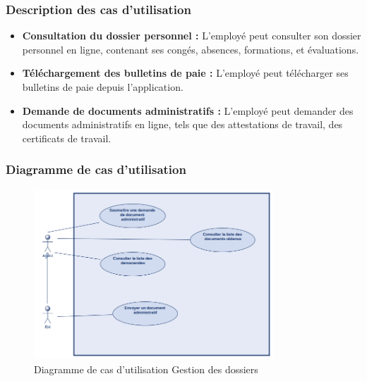 \subsubsection{Description des cas d'utilisation}
\begin{itemize}
    \item \textbf{Consultation du dossier personnel :} L'employé peut consulter son dossier personnel en ligne, contenant ses congés, absences, formations, et évaluations.
    \item \textbf{Téléchargement des bulletins de paie :} L'employé peut télécharger ses bulletins de paie depuis l'application.
    \item \textbf{Demande de documents administratifs :} L'employé peut demander des documents administratifs en ligne, tels que des attestations de travail, des certificats de travail.
\end{itemize}
\subsubsection{Diagramme de cas d'utilisation}
\begin{figure}[H]
    \centering
    \includegraphics[width=0.8\textwidth]{images/diagrammes/use-cases/dossiers.png}
    \caption{Diagramme de cas d'utilisation Gestion des dossiers}
    \label{fig:use_case_gestion_dossiers}
\end{figure}
